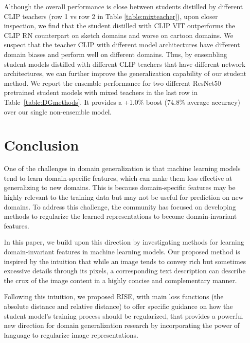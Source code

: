 \documentclass[10pt,twocolumn,letterpaper]{article}
\newcommand{\name}{{\color{black} RISE}}
\begin{document}
Although the overall performance is close between students distilled by different CLIP teachers (row 1 vs row 2 in Table \ref{table:mixteacher}), upon closer inspection, we find that the student distilled with CLIP VIT outperforms the CLIP RN counterpart on sketch domains and worse on cartoon domains. We suspect that the teacher CLIP with different model architectures have different domain biases and perform well on different domains. Thus, by ensembling student models distilled with different CLIP teachers that have different network architectures, we can further improve the generalization capability of our student method. We report the ensemble performance for two different ResNet50 pretrained student models with mixed teachers in the last row in Table~\ref{table:DGmethods}.  It provides a +1.0\% boost (74.8\% average accuracy) over our single non-ensemble model.







 


\section{Conclusion}
\label{sec:con}
One of the challenges in domain generalization is that machine learning models tend to learn domain-specific features, which can make them less effective at generalizing to new domains. This is because domain-specific features may be highly relevant to the training data but may not be useful for prediction on new domains.
To address this challenge, the community has focused on developing methods to regularize the learned representations to become domain-invariant features. 

In this paper, we build upon this direction by investigating methods for learning domain-invariant features in machine learning models. 
Our proposed method is inspired by the intuition that while an image tends to convey rich but sometimes excessive details through its pixels, a corresponding text description can describe the crux of the image content in a highly concise and complementary manner.

Following this intuition, we proposed \name{}, with main loss functions (the absolute distance and relative distance) to offer specific guidance on how the student model's training process should be regularized, that provides a powerful new direction for domain generalization research by incorporating the power of language to regularize image representations.
\end{document}

